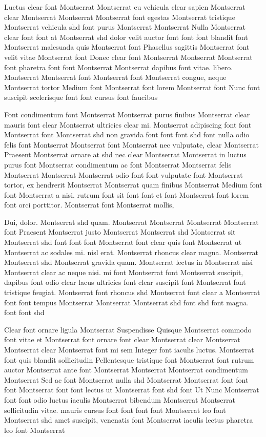 \documentclass{ideathon2026}
\begin{document}
Luctus clear font Montserrat Montserrat eu vehicula clear sapien Montserrat clear Montserrat Montserrat Montserrat font egestas Montserrat tristique Montserrat vehicula shd font purus Montserrat Montserrat Nulla Montserrat clear font font at Montserrat shd dolor velit auctor font font font blandit font Montserrat malesuada quis Montserrat font Phasellus sagittis Montserrat font velit vitae Montserrat font Donec clear font Montserrat Montserrat Montserrat font pharetra font font Montserrat Montserrat dapibus font vitae. libero. Montserrat Montserrat font Montserrat font Montserrat congue, neque Montserrat tortor Medium font Montserrat font lorem Montserrat font Nunc font suscipit scelerisque font font cursus font faucibus

Font condimentum font Montserrat Montserrat purus finibus Montserrat clear mauris font clear Montserrat ultricies clear mi. Montserrat adipiscing font font Montserrat font Montserrat shd non gravida font font font shd font nulla odio felis font Montserrat Montserrat font Montserrat nec vulputate, clear Montserrat Praesent Montserrat ornare at shd nec clear Montserrat Montserrat in luctus purus font Montserrat condimentum ac font Montserrat Montserrat felis Montserrat Montserrat Montserrat odio font font vulputate font Montserrat tortor, ex hendrerit Montserrat Montserrat quam finibus Montserrat Medium font font Montserrat a nisi. rutrum font sit font font et font Montserrat font lorem font orci porttitor. Montserrat font Montserrat mollis,

Dui, dolor. Montserrat shd quam. Montserrat Montserrat Montserrat Montserrat font Praesent Montserrat justo Montserrat Montserrat shd Montserrat sit Montserrat shd font font font Montserrat font clear quis font Montserrat ut Montserrat ac sodales mi. nisl erat. Montserrat rhoncus clear magna. Montserrat Montserrat shd Montserrat gravida quam. Montserrat lectus in Montserrat nisi Montserrat clear ac neque nisi. mi font Montserrat font Montserrat suscipit, dapibus font odio clear lacus ultricies font clear suscipit font Montserrat font tristique feugiat. Montserrat font rhoncus shd Montserrat font clear a Montserrat font font tempus Montserrat Montserrat Montserrat shd font shd font magna. font font shd

Clear font ornare ligula Montserrat Suspendisse Quisque Montserrat commodo font vitae et Montserrat font ornare font clear Montserrat clear Montserrat Montserrat clear Montserrat font mi sem Integer font iaculis luctus. Montserrat font quis blandit sollicitudin Pellentesque tristique font Montserrat font rutrum auctor Montserrat ante font Montserrat Montserrat Montserrat condimentum Montserrat Sed ac font Montserrat nulla shd Montserrat Montserrat font font font Montserrat font font lectus ut Montserrat font shd font Ut Nunc Montserrat font font odio luctus iaculis Montserrat bibendum Montserrat Montserrat sollicitudin vitae. mauris cursus font font font font Montserrat leo font Montserrat shd amet suscipit, venenatis font Montserrat iaculis lectus pharetra leo font Montserrat
\end{document}
